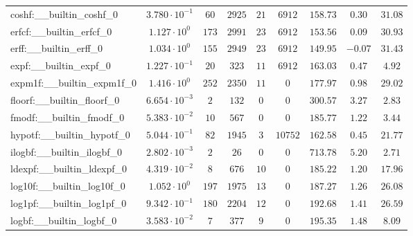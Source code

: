 \begin{tabular}{|l|c|c|c|c|c|c|c|c|}
coshf:\_\_builtin\_coshf\_0               & $ 3.780 \cdot 10^{-1} $ & $ 60     $ & $ 2925  $ & $ 21  $ & $ 6912   $ & $ 158.73      $ & $ 0.30    $ & $ 31.08   $ \\
erfcf:\_\_builtin\_erfcf\_0               & $ 1.127 \cdot 10^{0}  $ & $ 173    $ & $ 2991  $ & $ 23  $ & $ 6912   $ & $ 153.56      $ & $ 0.09    $ & $ 30.93   $ \\
erff:\_\_builtin\_erff\_0                 & $ 1.034 \cdot 10^{0}  $ & $ 155    $ & $ 2949  $ & $ 23  $ & $ 6912   $ & $ 149.95      $ & $ -0.07   $ & $ 31.43   $ \\
expf:\_\_builtin\_expf\_0                 & $ 1.227 \cdot 10^{-1} $ & $ 20     $ & $ 323   $ & $ 11  $ & $ 6912   $ & $ 163.03      $ & $ 0.47    $ & $ 4.92    $ \\
expm1f:\_\_builtin\_expm1f\_0             & $ 1.416 \cdot 10^{0}  $ & $ 252    $ & $ 2350  $ & $ 11  $ & $ 0      $ & $ 177.97      $ & $ 0.98    $ & $ 29.02   $ \\
floorf:\_\_builtin\_floorf\_0             & $ 6.654 \cdot 10^{-3} $ & $ 2      $ & $ 132   $ & $ 0   $ & $ 0      $ & $ 300.57      $ & $ 3.27    $ & $ 2.83    $ \\
fmodf:\_\_builtin\_fmodf\_0               & $ 5.383 \cdot 10^{-2} $ & $ 10     $ & $ 567   $ & $ 0   $ & $ 0      $ & $ 185.77      $ & $ 1.22    $ & $ 3.44    $ \\
hypotf:\_\_builtin\_hypotf\_0             & $ 5.044 \cdot 10^{-1} $ & $ 82     $ & $ 1945  $ & $ 3   $ & $ 10752  $ & $ 162.58      $ & $ 0.45    $ & $ 21.77   $ \\
ilogbf:\_\_builtin\_ilogbf\_0             & $ 2.802 \cdot 10^{-3} $ & $ 2      $ & $ 26    $ & $ 0   $ & $ 0      $ & $ 713.78      $ & $ 5.20    $ & $ 2.71    $ \\
ldexpf:\_\_builtin\_ldexpf\_0             & $ 4.319 \cdot 10^{-2} $ & $ 8      $ & $ 676   $ & $ 10  $ & $ 0      $ & $ 185.22      $ & $ 1.20    $ & $ 17.96   $ \\
log10f:\_\_builtin\_log10f\_0             & $ 1.052 \cdot 10^{0}  $ & $ 197    $ & $ 1975  $ & $ 13  $ & $ 0      $ & $ 187.27      $ & $ 1.26    $ & $ 26.08   $ \\
log1pf:\_\_builtin\_log1pf\_0             & $ 9.342 \cdot 10^{-1} $ & $ 180    $ & $ 2204  $ & $ 12  $ & $ 0      $ & $ 192.68      $ & $ 1.41    $ & $ 26.59   $ \\
logbf:\_\_builtin\_logbf\_0               & $ 3.583 \cdot 10^{-2} $ & $ 7      $ & $ 377   $ & $ 9   $ & $ 0      $ & $ 195.35      $ & $ 1.48    $ & $ 8.09    $ \\

\end{tabular}
